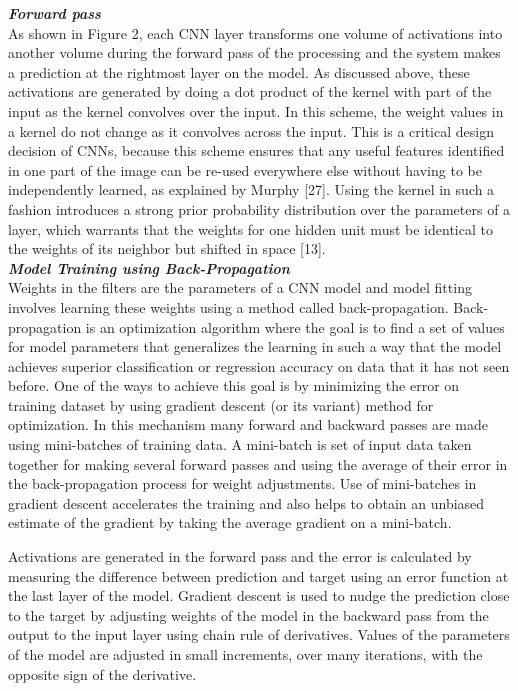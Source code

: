 \documentclass [11pt,letterpaper ,twoside ,openany ]{report}
\begin{document}
    \noindent
    \textbf{\textit{Forward pass}}\\
    As shown in Figure 2, each CNN layer transforms one volume of activations into another volume during the forward pass of the processing and the system makes a prediction at the rightmost layer on the model. As discussed above, these activations are generated by doing a dot product of the kernel with part of the input as the kernel convolves over the input. In this scheme, the weight values in a kernel do not change as it convolves across the input. This is a critical design decision of CNNs, because this scheme ensures that any useful features identified in one part of the image can be re-used everywhere else without having to be independently learned, as explained by Murphy [27]. Using the kernel in such a fashion introduces a strong prior probability distribution over the parameters of a layer, which warrants that the weights for one hidden unit must be identical to the weights of its neighbor but shifted in space [13].\\

    \noindent
    \textbf{\textit{Model Training using Back-Propagation}} \\
    Weights in the filters are the parameters of a CNN model and model fitting involves learning these weights using a method called back-propagation. Back-propagation is an optimization algorithm where the goal is to find a set of values for model parameters that generalizes the learning in such a way that the model achieves superior classification or regression accuracy on data that it has not seen before. One of the ways to achieve this goal is by minimizing the error on training dataset by using gradient descent (or its variant) method for optimization. In this mechanism many forward and backward passes are made using mini-batches of training data. A mini-batch is set of input data taken together for making several forward passes and using the average of their error in the back-propagation process for weight adjustments. Use of mini-batches in gradient descent accelerates the training and also helps to obtain an unbiased estimate of the gradient by taking the average gradient on a mini-batch. 

    Activations are generated in the forward pass and the error is calculated by measuring the difference between prediction and target using an error function at the last layer of the model. Gradient descent is used to nudge the prediction close to the target by adjusting weights of the model in the backward pass from the output to the input layer using chain rule of derivatives. Values of the parameters of the model are adjusted in small increments, over many iterations, with the opposite sign of the derivative.
\end{document}
